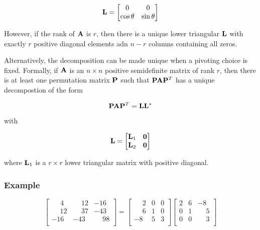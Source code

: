 \begin{equation}
    \mathbf{L} =
    \begin{bmatrix}
        0 & 0 \\
        \cos \theta & \sin \theta
    \end{bmatrix}
\end{equation}

However, if the rank of $ \mathbf{A} $ is $ r $, then there is a unique lower triangular
$ \mathbf{L} $ with exactly $ r $ positive diagonal elements adn $ n - r $ columns
containing all zeros.

Alternatively, the decomposition can be made unique when  a pivoting choice is
fixed. Formally, if $ \mathbf{A} $ is an $ n \times n $ positive semidefinite matrix
of rank $ r $, then there is at least one permutation matrix $ \mathbf{P} $ such
that $ \mathbf{P} \mathbf{A} \mathbf{P}^T $ has a unique decompostion of the form

\begin{equation}
    \mathbf{P} \mathbf{A} \mathbf{P}^T = \mathbf{L} \mathbf{L}^*
\end{equation}

with

\begin{equation}
    \mathbf{L} = \begin{bmatrix}
        \mathbf{L}_1 & \mathbf{0} \\
        \mathbf{L}_2 & \mathbf{0} \\
    \end{bmatrix}
\end{equation}

where $ \mathbf{L}_1 $ is a $ r \times r $ lower triangular matrix with positive
diagonal.


\subsubsection{Example}

\begin{equation}
    \begin{bmatrix}
        \phantom{-1}4 & \phantom{-}12 & -16 \\
        \phantom{-}12 & \phantom{-}37 & -43 \\
        -16 & -43 & \phantom{-}98 \\
    \end{bmatrix}
    = \begin{bmatrix}
        \phantom{-}2 & 0 & 0 \\
        \phantom{-}6 & 1 & 0 \\
        -8 & 5 & 3 \\
    \end{bmatrix}
    \begin{bmatrix}
        2 & 6 & -8 \\
        0 & 1 & \phantom{-}5 \\
        0 & 0 & \phantom{-}3 \\
    \end{bmatrix}
\end{equation}


